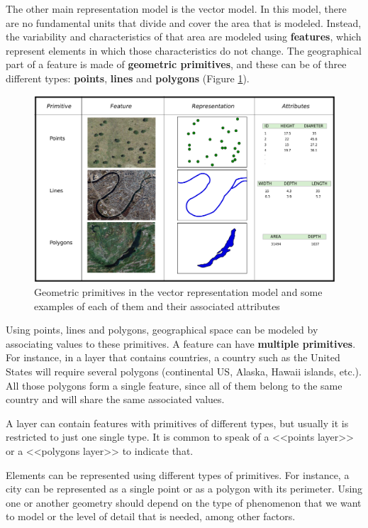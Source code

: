 The other main representation model is the vector model. In this model, there are no fundamental units that divide and cover the area that is modeled. Instead, the variability and characteristics of that area are modeled using \textbf{features}, which represent elements in which those characteristics do not change. The geographical part of a feature is made of \textbf{geometric primitives}, and these can be of three different types: \textbf{points}, \textbf{lines} and \textbf{polygons} (Figure \ref{Fig:Primitives}).

\begin{figure}[!hbt]   
\centering
\includegraphics[width=\textwidth]{Data/Primitives.pdf}
\caption{\small Geometric primitives in the vector representation model and some examples of each of them and their associated attributes}
\label{Fig:Primitives} 
\end{figure}

Using points, lines and polygons, geographical space can be modeled by associating values to these primitives. A feature can have \textbf{multiple primitives}. For instance, in a layer that contains countries, a country such as the United States will require several polygons (continental US, Alaska, Hawaii islands, etc.). All those polygons form a single feature, since all of them belong to the same country and will share the same associated values.

A layer can contain features with primitives of different types, but usually it is restricted to just one single type. It is common to speak of a <<points layer>> or a <<polygons layer>> to indicate that. 

Elements can be represented using different types of primitives. For instance, a city can be represented as a single point or as a polygon with its perimeter. Using one or another geometry should depend on the type of phenomenon that we want to model or the level of detail that is needed, among other factors.

